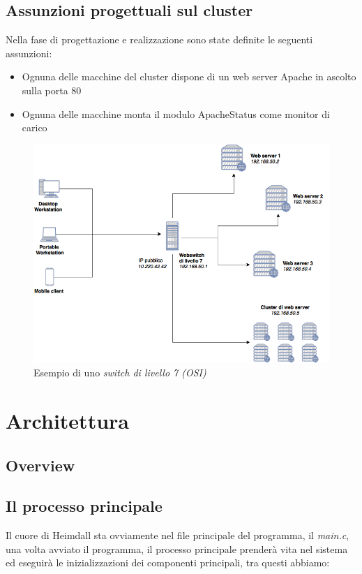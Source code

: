 \documentclass[italian]{tktltiki2}
\begin{document}
\subsection{Assunzioni progettuali sul cluster}
Nella fase di progettazione e realizzazione sono state definite le seguenti assunzioni:
\begin{itemize}
	\item Ognuna delle macchine del cluster dispone di un web server Apache\cite{apache_server} in ascolto sulla porta 80
	\item Ognuna delle macchine monta il modulo ApacheStatus come monitor di carico
\end{itemize}

\begin{figure}
\centering
\includegraphics[width=\textwidth]{images/switch7}
\caption{Esempio di uno \emph{switch di livello 7 (OSI)}}
\end{figure}

\newpage
\section{Architettura}
\label{sec:architecture}

\subsection{Overview}
\label{ssec:overview}

\subsection{Il processo principale}
\label{ssec:main_process}
Il cuore di Heimdall sta ovviamente nel file principale del programma, il \emph{main.c}, una volta avviato il programma, il processo principale prenderà vita nel sistema ed eseguirà le inizializzazioni dei componenti principali, tra questi abbiamo:
\end{document}
